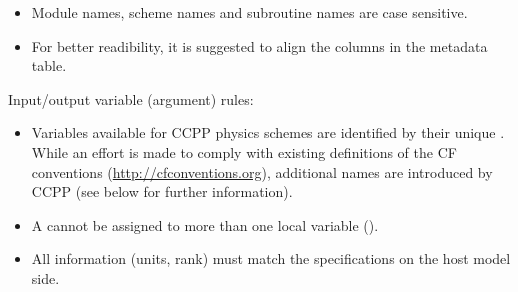 \begin{itemize}
\begin{lstlisting}[language=Fortran]
#if 0
!> \section arg_table_scheme_template_run Argument Table
...
!!
#endif
\end{lstlisting}
\item Module names, scheme names and subroutine names are case sensitive.
\item For better readibility, it is suggested to align the columns in the metadata table.
\end{itemize}

Input/output variable (argument) rules:
\begin{itemize}
\item Variables available for CCPP physics schemes are identified by their unique . While an effort is made to comply with existing  definitions of the CF conventions (\url{http://cfconventions.org}), additional names are introduced by CCPP (see below for further information).
\item A  cannot be assigned to more than one local variable ().
\item All information (units, rank) must match the specifications on the host model side.
\end{itemize}

